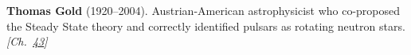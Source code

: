 \textbf{Thomas Gold} (1920–2004). Austrian-American astrophysicist who co-proposed the Steady State theory and correctly identified pulsars as rotating neutron stars. \emph{[Ch.~\hyperref[ch:nearflatuniverse]{43}]}

